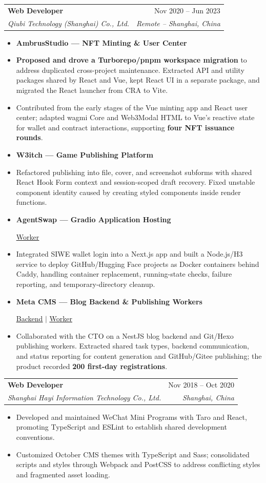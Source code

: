 \documentclass[a4paper,11pt]{article}
\makeatletter
\newcommand{\resumeItem}[1]{
  \item\small{#1}
}
\newcommand{\resumeProjectHeading}[1]{
  \item[] \hspace*{-\leftmargin}\textbf{#1}
}
\newcommand{\resumeItemListStart}{\begin{itemize}[rightmargin=0.11in]}
\newcommand{\resumeItemListEnd}{\end{itemize}}
\newcommand{\resumeQuadHeading}[4]{
  \item
  \begin{tabular*}{0.96\textwidth}[t]{l@{\extracolsep{\fill}}r}
    \textbf{#1} & #2 \\
    \textit{\small#3} & \textit{\small #4} \\
  \end{tabular*}
}
\makeatother
\begin{document}
  \resumeQuadHeading{Web Developer}{Nov 2020 -- Jun 2023}
    {Qiubi Technology (Shanghai) Co., Ltd.}{Remote -- Shanghai, China}

  \resumeItemListStart{}
    \resumeProjectHeading{AmbrusStudio --- NFT Minting \& User Center}
    \resumeItem{\textbf{Proposed and drove a Turborepo/pnpm workspace migration} to address duplicated cross-project maintenance. Extracted API and utility packages shared by React and Vue, kept React UI in a separate package, and migrated the React launcher from CRA to Vite.}
    \resumeItem{Contributed from the early stages of the Vue minting app and React user center; adapted wagmi Core and Web3Modal HTML to Vue's reactive state for wallet and contract interactions, supporting \textbf{four NFT issuance rounds}.}

    \resumeProjectHeading{W3itch --- Game Publishing Platform}
    \resumeItem{Refactored publishing into file, cover, and screenshot subforms with shared React Hook Form context and session-scoped draft recovery. Fixed unstable component identity caused by creating styled components inside render functions.}

    \resumeProjectHeading{AgentSwap --- Gradio Application Hosting}
      \hfill \href{https://github.com/agentswap/hosting-worker}{\uline{Worker}}
    \resumeItem{Integrated SIWE wallet login into a Next.js app and built a Node.js/H3 service to deploy GitHub/Hugging Face projects as Docker containers behind Caddy, handling container replacement, running-state checks, failure reporting, and temporary-directory cleanup.}

    \resumeProjectHeading{Meta CMS --- Blog Backend \& Publishing Workers}
      \hfill \href{https://github.com/Meta-Network/meta-cms-backend}{\uline{Backend}} $|$
      \href{https://github.com/Meta-Network/meta-cms-worker}{\uline{Worker}}
    \resumeItem{Collaborated with the CTO on a NestJS blog backend and Git/Hexo publishing workers. Extracted shared task types, backend communication, and status reporting for content generation and GitHub/Gitee publishing; the product recorded \textbf{200 first-day registrations}.}
  \resumeItemListEnd{}

  \resumeQuadHeading{Web Developer}{Nov 2018 -- Oct 2020}
    {Shanghai Hayi Information Technology Co., Ltd.}{Shanghai, China}
  \resumeItemListStart{}
    \resumeItem{Developed and maintained WeChat Mini Programs with Taro and React, promoting TypeScript and ESLint to establish shared development conventions.}
    \resumeItem{Customized October CMS themes with TypeScript and Sass; consolidated scripts and styles through Webpack and PostCSS to address conflicting styles and fragmented asset loading.}
  \resumeItemListEnd{}
\end{document}
